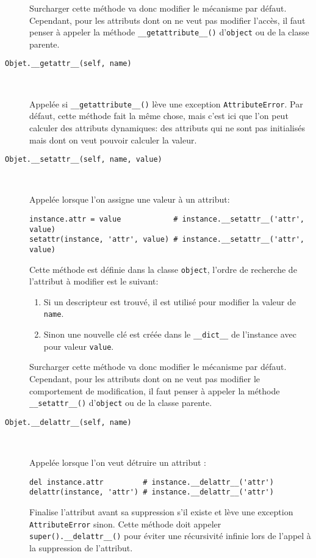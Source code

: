 \begin{description}
    Surcharger cette méthode va donc modifier le mécanisme par défaut. Cependant, pour les attributs dont on ne veut pas
    modifier l'accès, il faut penser à appeler la méthode \texttt{__getattribute__()} d'\texttt{object}
    ou de la classe parente.

    \item[\texttt{Objet.__getattr__(self, name)}]~

    Appelée si \texttt{__getattribute__()} lève une exception \texttt{AttributeError}. Par défaut, cette méthode fait la même chose, mais c'est ici que l'on peut calculer des attributs dynamiques: des attributs qui ne sont pas initialisés mais dont on veut pouvoir calculer la valeur.

    \item[\texttt{Objet.__setattr__(self, name, value)}]~

Appelée lorsque l'on assigne une valeur à un attribut: 
    \begin{verbatim}
instance.attr = value            # instance.__setattr__('attr', value)
setattr(instance, 'attr', value) # instance.__setattr__('attr', value)
    \end{verbatim}
    
    Cette méthode est définie dans la classe \texttt{object}, l'ordre de recherche de l'attribut à modifier
    est le suivant:
    \begin{enumerate}
        \item Si un descripteur est trouvé, il est utilisé pour modifier la valeur de \texttt{name}.
        \item Sinon une nouvelle clé est créée dans le \texttt{__dict__} de l'instance avec pour valeur
        \texttt{value}.
    \end{enumerate}

    Surcharger cette méthode va donc modifier le mécanisme par défaut. Cependant, pour les attributs dont on ne veut pas
    modifier le comportement de modification, il faut penser à appeler la méthode \texttt{__setattr__()} d'\texttt{object} ou de la classe parente.

    \item[\texttt{Objet.__delattr__(self, name)}]~

    Appelée lorsque l'on veut détruire un attribut : 
    \begin{verbatim}
del instance.attr         # instance.__delattr__('attr')
delattr(instance, 'attr') # instance.__delattr__('attr')
    \end{verbatim}
    
    Finalise l'attribut avant sa suppression s'il existe et lève une exception \texttt{AttributeError} sinon. Cette méthode doit appeler \texttt{super().__delattr__()} pour éviter une récursivité infinie lors de l'appel à la suppression de l'attribut.
\end{description}  


